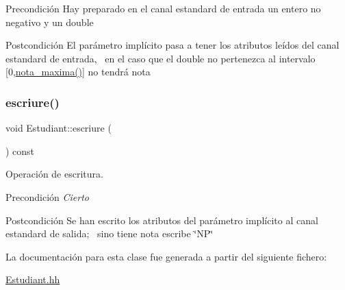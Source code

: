 \begin{DoxyPrecond}{Precondición}
Hay preparado en el canal estandard de entrada un entero no negativo y un double 
\end{DoxyPrecond}
\begin{DoxyPostcond}{Postcondición}
El parámetro implícito pasa a tener los atributos leídos del canal estandard de entrada,~\newline
 en el caso que el double no pertenezca al intervalo \mbox{[}0,\hyperlink{class_estudiant_a5df5eed414c87a2a1c2efa4194633afd}{nota\+\_\+maxima()}\mbox{]} no tendrá nota 
\end{DoxyPostcond}
\mbox{\label{class_estudiant_aa9a1736c5b133c65d0e9ba299bb41de5}} 
\subsubsection{\texorpdfstring{escriure()}{escriure()}}
{\footnotesize\ttfamily void Estudiant\+::escriure (\begin{DoxyParamCaption}{ }\end{DoxyParamCaption}) const}



Operación de escritura. 

\begin{DoxyPrecond}{Precondición}
{\itshape Cierto} 
\end{DoxyPrecond}
\begin{DoxyPostcond}{Postcondición}
Se han escrito los atributos del parámetro implícito al canal estandard de salida;~\newline
 sino tiene nota escribe \char`\"{}\+N\+P\char`\"{} 
\end{DoxyPostcond}


La documentación para esta clase fue generada a partir del siguiente fichero\+:\begin{DoxyCompactItemize}
\item 
\hyperlink{_estudiant_8hh}{Estudiant.\+hh}\end{DoxyCompactItemize}
